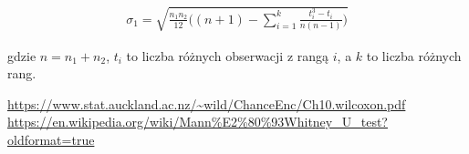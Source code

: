 \documentclass[a4paper]{article}
\begin{document}
\begin{align}
    \sigma_1 = \sqrt{\frac{n_1 n_2}{12} \bigg( (n+1) - \sum_{i=1}^{k}{\frac{t_i^{3} -t_i}{n(n-1)}} \bigg)}
\end{align}

gdzie $n = n_1 + n_2$, $t_i$ to liczba różnych obserwacji z rangą $i$, a $k$ to liczba różnych rang.

\begin{thebibliography}{9}
 \url{https://www.stat.auckland.ac.nz/~wild/ChanceEnc/Ch10.wilcoxon.pdf}
 \url{https://en.wikipedia.org/wiki/Mann%E2%80%93Whitney_U_test?oldformat=true}
\end{thebibliography}
\end{document}
